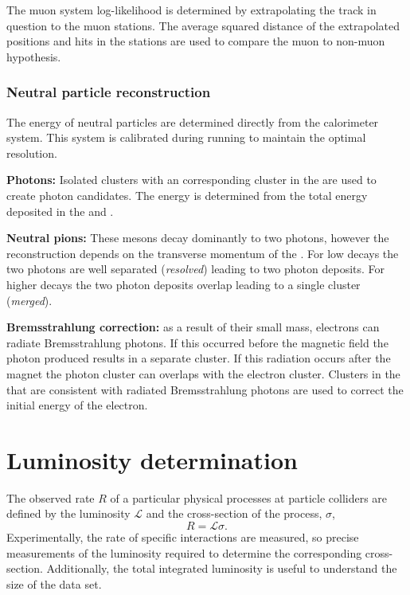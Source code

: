 The muon system log-likelihood is determined by extrapolating the track in question to the muon stations. The average squared distance of the extrapolated positions and hits in the stations are used to compare the muon to non-muon hypothesis.   

\subsubsection{Neutral particle reconstruction}

The energy of neutral particles are determined directly from the calorimeter system. This system is calibrated during running to maintain the optimal resolution.  

\begin{description}
\item\textbf{Photons:} Isolated \ecal clusters with an corresponding cluster in the \presh are used to create photon candidates. The energy is determined from the total energy deposited in the \ecal and \presh. 
\item \textbf{Neutral pions:} These mesons decay dominantly to two photons, however the reconstruction depends on the transverse momentum of the \piz. For low \pt decays the two photons are well separated (\emph{resolved}) leading to two photon deposits. For higher \pt decays the two photon deposits overlap leading to a single \ecal cluster (\emph{merged}). 
\item \textbf{Bremsstrahlung correction:} as a result of their small mass, electrons can radiate Bremsstrahlung photons. If this occurred before the magnetic field the photon produced results in a separate \ecal cluster. If this radiation occurs after the magnet the photon cluster can overlaps with the electron cluster. Clusters in the \ecal that are consistent with radiated Bremsstrahlung photons are used to correct the initial energy of the electron.
\end{description}



\section{Luminosity determination}
The observed rate $R$ of a particular physical processes at particle colliders are defined by the luminosity $\mathcal{L}$ and the cross-section of the process, $\sigma$, 
\begin{equation}
R = \mathcal{L}\sigma.
\label{eq:lumi}
\end{equation}
Experimentally, the rate of specific interactions are measured, so precise measurements of the luminosity required to determine the corresponding cross-section. Additionally, the total integrated luminosity is useful to understand the size of the data set.

